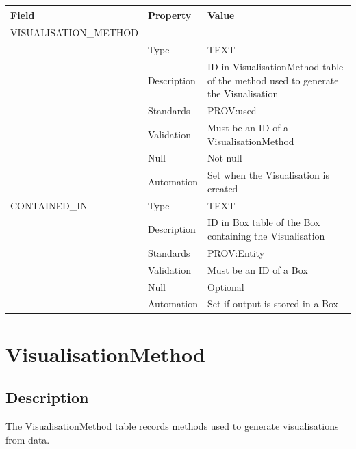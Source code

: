 \begin{longtable}[]{@{}
  >{\raggedright\arraybackslash}p{}
  >{\raggedright\arraybackslash}p{}
  >{\raggedright\arraybackslash}p{}@{}}
\toprule\noalign{}
\begin{minipage}[b]{\linewidth}\raggedright
Field
\end{minipage} & \begin{minipage}[b]{\linewidth}\raggedright
Property
\end{minipage} & \begin{minipage}[b]{\linewidth}\raggedright
Value
\end{minipage} \\
\midrule\noalign{}
\endhead
\bottomrule\noalign{}
\endlastfoot
VISUALISATION\_METHOD & & \\
& Type & TEXT \\
& Description & ID in VisualisationMethod table of the method used to
generate the Visualisation \\
& Standards & PROV:used \\
& Validation & Must be an ID of a VisualisationMethod \\
& Null & Not null \\
& Automation & Set when the Visualisation is created \\
CONTAINED\_IN & Type & TEXT \\
& Description & ID in Box table of the Box containing the
Visualisation \\
& Standards & PROV:Entity \\
& Validation & Must be an ID of a Box \\
& Null & Optional \\
& Automation & Set if output is stored in a Box \\
\end{longtable}

\section{VisualisationMethod}\label{visualisationmethod}

\subsection{Description}\label{description-40}

The VisualisationMethod table records methods used to generate
visualisations from data.

